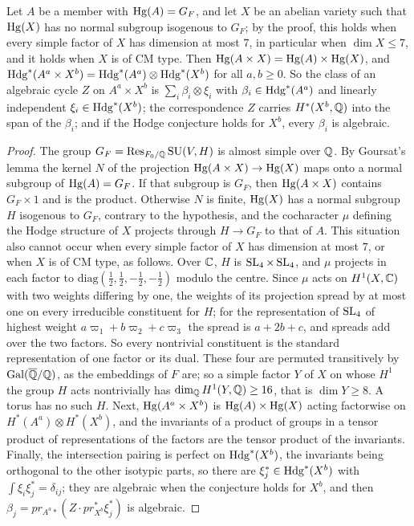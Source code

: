 \begin{proposition}
\label{prop:quarticnogo}
Let $A$ be a member with $\operatorname{Hg}(A)=G_{F}$, and let $X$ be an abelian variety
such that $\operatorname{Hg}(X)$ has no normal subgroup isogenous to $G_{F}$; by the proof,
this holds when every simple factor of $X$ has dimension at most $7$, in
particular when $\dim X\le7$, and it holds when $X$ is of CM type. Then
$\operatorname{Hg}(A\times X)=\operatorname{Hg}(A)\times\operatorname{Hg}(X)$, and
$\mathrm{Hdg}^{*}(A^{a}\times X^{b})=\mathrm{Hdg}^{*}(A^{a})\otimes\mathrm{Hdg}^{*}(X^{b})$ for all
$a,b\ge0$. So the class of an algebraic cycle $Z$ on $A^{a}\times X^{b}$ is
$\sum_{i}\beta_{i}\otimes\xi_{i}$ with $\beta_{i}\in\mathrm{Hdg}^{*}(A^{a})$ and
linearly independent $\xi_{i}\in\mathrm{Hdg}^{*}(X^{b})$; the correspondence $Z$
carries $H^{*}(X^{b},\mathbb{Q})$ into the span of the $\beta_{i}$; and if the Hodge
conjecture holds for $X^{b}$, every $\beta_{i}$ is algebraic.
\end{proposition}

\begin{proof}
The group $G_{F}=\operatorname{Res}_{F_{0}/\mathbb{Q}}\operatorname{SU}(V,H)$ is almost simple over $\mathbb{Q}$. By
Goursat's lemma the kernel $N$ of the projection $\operatorname{Hg}(A\times X)\to\operatorname{Hg}(X)$
maps onto a normal subgroup of $\operatorname{Hg}(A)=G_{F}$. If that subgroup is $G_{F}$,
then $\operatorname{Hg}(A\times X)$ contains $G_{F}\times1$ and is the product. Otherwise
$N$ is finite, $\operatorname{Hg}(X)$ has a normal subgroup $H$ isogenous to $G_{F}$,
contrary to the hypothesis, and the cocharacter $\mu$ defining the Hodge
structure of $X$ projects through $H\to G_{F}$ to that of $A$. This situation
also cannot occur when every simple factor of $X$ has dimension at most $7$,
or when $X$ is of CM type, as follows. Over $\mathbb{C}$, $H$ is $\operatorname{SL}_{4}\times\operatorname{SL}_{4}$,
and $\mu$ projects in each factor to
$\mathrm{diag}(\frac12,\frac12,-\frac12,-\frac12)$ modulo the centre. Since
$\mu$ acts on $H^{1}(X,\mathbb{C})$ with two weights differing by one, the weights of
its projection spread by at most one on every irreducible constituent for
$H$; for the representation of $\operatorname{SL}_{4}$ of highest weight
$a\varpi_{1}+b\varpi_{2}+c\varpi_{3}$ the spread is $a+2b+c$, and spreads add
over the two factors. So every nontrivial constituent is the standard
representation of one factor or its dual. These four are permuted
transitively by $\operatorname{Gal}(\overline{\mathbb{Q}}/\mathbb{Q})$, as the embeddings of $F$ are; so a simple
factor $Y$ of $X$ on whose $H^{1}$ the group $H$ acts nontrivially has
$\dim_{\mathbb{Q}}H^{1}(Y,\mathbb{Q})\ge16$, that is $\dim Y\ge8$. A torus has no such $H$.
Next, $\operatorname{Hg}(A^{a}\times X^{b})$ is $\operatorname{Hg}(A)\times\operatorname{Hg}(X)$ acting factorwise on
$H^{*}(A^{a})\otimes H^{*}(X^{b})$, and the invariants of a product of groups
in a tensor product of representations of the factors are the tensor product
of the invariants. Finally, the intersection pairing is perfect on
$\mathrm{Hdg}^{*}(X^{b})$, the invariants being orthogonal to the other isotypic
parts, so there are $\xi_{j}^{*}\in\mathrm{Hdg}^{*}(X^{b})$ with
$\int\xi_{i}\xi_{j}^{*}=\delta_{ij}$; they are algebraic when the conjecture
holds for $X^{b}$, and then $\beta_{j}=pr_{A^{a}*}(Z\cdot pr_{X^{b}}^{*}\xi_{j}^{*})$
is algebraic.
\end{proof}


